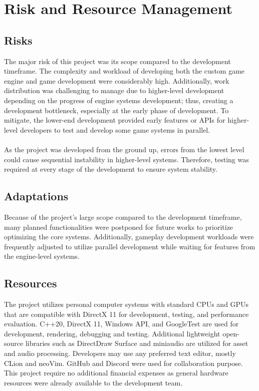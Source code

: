 \section{Risk and Resource Management}
\label{sec:risk-and-resource-management}

\subsection{Risks}
\label{subsec:risk}

The major risk of this project was its scope compared to the development timeframe.
The complexity and workload of developing both the custom game engine and game development were considerably high.
Additionally, work distribution was challenging to manage due to higher-level development depending on the progress of
engine systems development; thus, creating a development bottleneck, especially at the early phase of development.
To mitigate, the lower-end development provided early features or APIs for higher-level developers to test and develop
some game systems in parallel.
\\\\
As the project was developed from the ground up, errors from the lowest level could cause sequential instability in higher-level systems.
Therefore, testing was required at every stage of the development to ensure system stability.


\subsection{Adaptations}
\label{subsec:adaptations}

Because of the project's large scope compared to the development timeframe, many planned functionalities were postponed for
future works to prioritize optimizing the core systems.
Additionally, gameplay development workloads were frequently adjusted to utilize parallel development
while waiting for features from the engine-level systems.


\subsection{Resources}
\label{subsec:resources}

The project utilizes personal computer systems with standard CPUs and GPUs that are compatible with DirectX 11
for development, testing, and performance evaluation.
C++20, DirectX 11, Windows API, and GoogleTest are used for development, rendering, debugging and testing.
Additional lightweight open-source libraries such as DirectDraw Surface and miniaudio are utilized for asset and audio processing.
Developers may use any preferred text editor, mostly CLion and neoVim.
GitHub and Discord were used for collaboration purpose.
This project require no additional financial expenses as general hardware resources were already available to the development team.


